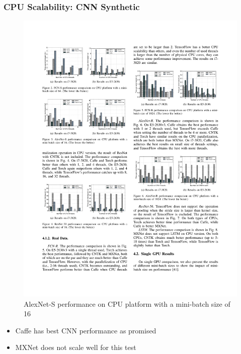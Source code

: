\begin{frame}
	\MyLogo
	\frametitle{CPU Scalability: CNN Synthetic}  

	\begin{figure}[htbp] 
		\includegraphics[width=\linewidth]{figures/AlexNet-S1.pdf} 
		\caption{AlexNet-S performance on CPU platform with a mini-batch size of 16}
	\end{figure}
	
\vskip -10pt
\begin{mdframed}[style=mystyle1]
\begin{itemize}
\item Caffe has best CNN performance as promised
\item MXNet does not scale well for this test
\end{itemize}
\end{mdframed}
	
\end{frame}


